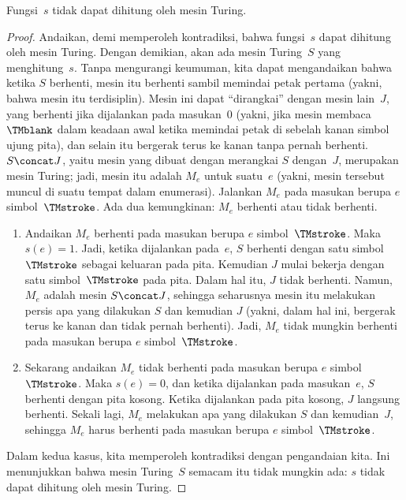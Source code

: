 \documentclass[../../../include/open-logic-section]{subfiles}
\begin{document}
\begin{lem}
Fungsi~$s$ tidak dapat dihitung oleh mesin Turing.
\end{lem}

\begin{proof}
Andaikan, demi memperoleh kontradiksi, bahwa fungsi~$s$ dapat dihitung oleh
mesin Turing. Dengan demikian, akan ada mesin Turing~$S$ yang menghitung~$s$.
Tanpa mengurangi keumuman, kita dapat mengandaikan bahwa ketika $S$ berhenti,
mesin itu berhenti sambil memindai petak pertama (yakni, bahwa mesin itu
terdisiplin). Mesin ini dapat ``dirangkai'' dengan mesin lain~$J$, yang
berhenti jika dijalankan pada masukan~$0$ (yakni, jika mesin membaca
$\TMblank$ dalam keadaan awal ketika memindai petak di sebelah kanan simbol
ujung pita), dan selain itu bergerak terus ke kanan tanpa pernah berhenti.
$S \concat J$, yaitu mesin yang dibuat dengan merangkai $S$ dengan~$J$,
merupakan mesin Turing; jadi, mesin itu adalah $M_e$ untuk suatu~$e$ (yakni,
mesin tersebut muncul di suatu tempat dalam enumerasi). Jalankan $M_e$ pada
masukan berupa $e$ simbol~$\TMstroke$. Ada dua kemungkinan: $M_e$ berhenti
atau tidak berhenti.
\begin{enumerate}
\item Andaikan $M_e$ berhenti pada masukan berupa $e$ simbol~$\TMstroke$.
  Maka $s(e) = 1$. Jadi, ketika dijalankan pada~$e$, $S$ berhenti dengan satu
  simbol~$\TMstroke$ sebagai keluaran pada pita. Kemudian $J$ mulai bekerja
  dengan satu simbol~$\TMstroke$ pada pita. Dalam hal itu, $J$ tidak berhenti.
  Namun, $M_e$ adalah mesin $S \concat J$, sehingga seharusnya mesin itu
  melakukan persis apa yang dilakukan $S$ dan kemudian $J$ (yakni, dalam hal
  ini, bergerak terus ke kanan dan tidak pernah berhenti). Jadi, $M_e$ tidak
  mungkin berhenti pada masukan berupa $e$ simbol~$\TMstroke$.

\item Sekarang andaikan $M_e$ tidak berhenti pada masukan berupa $e$
  simbol~$\TMstroke$. Maka $s(e) = 0$, dan ketika dijalankan pada masukan~$e$,
  $S$ berhenti dengan pita kosong. Ketika dijalankan pada pita kosong, $J$
  langsung berhenti. Sekali lagi, $M_e$ melakukan apa yang dilakukan $S$ dan
  kemudian~$J$, sehingga $M_e$ harus berhenti pada masukan berupa $e$
  simbol~$\TMstroke$.
\end{enumerate}
Dalam kedua kasus, kita memperoleh kontradiksi dengan pengandaian kita. Ini
menunjukkan bahwa mesin Turing~$S$ semacam itu tidak mungkin ada: $s$ tidak
dapat dihitung oleh mesin Turing.
\end{proof}
\end{document}
